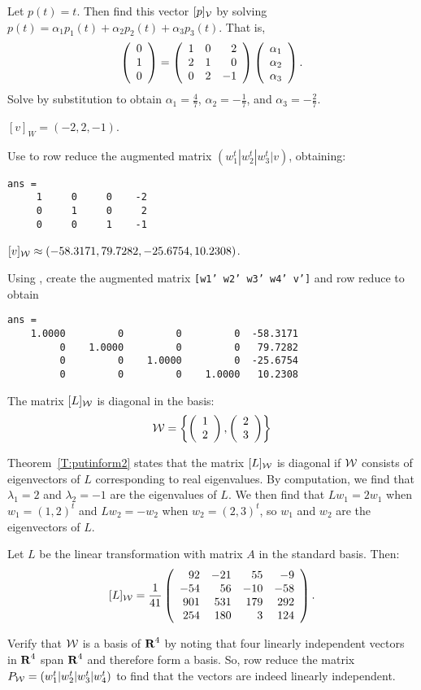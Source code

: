 \documentclass{ximera}
\begin{document}
\para Let $p(t) = t$.  Then find this vector $[p]_{\cal V}$ by solving
$p(t) = \alpha_1p_1(t) + \alpha_2p_2(t) + \alpha_3p_3(t)$. 
That is,
\[ \left(\begin{array}{r} 0 \\ 1 \\ 0\end{array}\right) = \left(\begin{array}{rrr} 1 & 0 & 2 \\ 2 & 1 & 0 \\ 0 & 2 & -1\end{array}\right)
\left(\begin{array}{r} \alpha_1 \\ \alpha_2 \\ \alpha_3\end{array}\right). \]
Solve by substitution to obtain $\alpha_1 = \frac{4}{7}$, $\alpha_2
= -\frac{1}{7}$, and $\alpha_3 = -\frac{2}{7}$.

\ans $[v]_W = (-2,2,-1)$.

\soln Use \Matlab to row reduce the augmented matrix
$(w_1^t|w_2^t|w_3^t|v)$, obtaining:
\begin{verbatim}
ans = 
     1     0     0    -2
     0     1     0     2
     0     0     1    -1
\end{verbatim}

\ans $[v]_{\cal W} \approx (-58.3171, 79.7282, -25.6754, 10.2308)$.

\soln Using \Matlab, create the augmented matrix
{\tt [w1' w2' w3' w4' v']} and row reduce to obtain
\begin{verbatim}
ans =
    1.0000         0         0         0  -58.3171
         0    1.0000         0         0   79.7282
         0         0    1.0000         0  -25.6754
         0         0         0    1.0000   10.2308
\end{verbatim}

\ans The matrix $[L]_{\cal W}$ is diagonal in the basis:
\[
{\cal W} = \left\{\left(\begin{array}{r} 1 \\ 2\end{array}\right),\left(\begin{array}{r} 2 \\ 3\end{array}\right)\right\}
\]

\soln Theorem~\ref{T:putinform2} states
that the matrix $[L]_{\cal W}$ is diagonal if ${\cal W}$ consists of
eigenvectors of $L$ corresponding to real eigenvalues.  By
computation, we find that $\lambda_1 = 2$ and $\lambda_2 = -1$ are
the eigenvalues of $L$.  We then find that $Lw_1 = 2w_1$ when
$w_1 = (1,2)^t$ and $Lw_2 = -w_2$ when $w_2 = (2,3)^t$, so $w_1$ and
$w_2$ are the eigenvectors of $L$.

 \ans Let $L$ be the linear transformation with matrix $A$ in
the standard basis.  Then:
\[
[L]_{\cal W} = \frac{1}{41}\left(\begin{array}{rrrr} 92 & -21 & 55 &
-9 \\ -54 & 56 & -10 & -58 \\ 901 & 531 & 179 & 292 \\ 254 & 180 & 3 &
124 \end{array}\right).
\]

\soln Verify that ${\cal W}$ is a basis of $\mbox{$\bf{R}$}^4$ by noting that
four linearly independent vectors in $\mbox{$\bf{R}$}^4$ span $\mbox{$\bf{R}$}^4$ and
therefore form a basis.  So, row reduce the matrix
$P_{\cal W} = (w_1^t|w_2^t|w_3^t|w_4^t)$ to find that the vectors are indeed
linearly independent.
\end{document}
